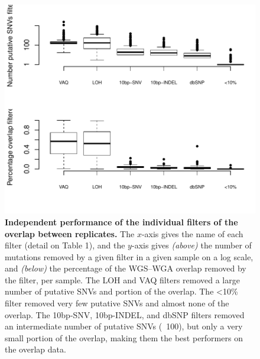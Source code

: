 \documentclass[11 pt]{article} %
\begin{document}
\begin{figure}
\centerline{
\includegraphics[width=6in]{Figure4.pdf} }
\caption{\textbf{Independent performance of the individual filters of the overlap between replicates.} The $x$-axis gives the name of each filter (detail on Table 1), and the $y$-axis gives \textit{(above)} the number of mutations removed by a given filter in a given sample on a log scale, and \textit{(below)} the percentage of the WGS--WGA overlap removed by the filter, per sample. The LOH and VAQ filters removed a large number of putative SNVs and portion of the overlap. The <10\% filter removed very few putative SNVs and almost none of the overlap. The 10bp-SNV, 10bp-INDEL, and dbSNP filters removed an intermediate number of putative SNVs (~100), but only a very small portion of the overlap, making them the best performers on the overlap data. }
\label{fig:boxplot_filtered}
\end{figure}
\end{document}
